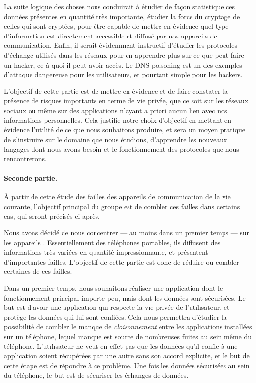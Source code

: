 \documentclass[a4paper, 12pt,twoside]{article}
\begin{document}
		La suite logique des choses nous conduirait à étudier de façon statistique ces données présentes en quantité très importante, étudier la force du cryptage de celles qui sont cryptées, pour être capable de mettre en évidence quel type d'information est directement accessible et diffusé par nos appareils de communication. Enfin,  il serait évidemment instructif d'étudier les protocoles d'échange utilisés dans les réseaux pour en apprendre plus sur ce que peut faire un hacker, ce à quoi il peut avoir accès. Le DNS poisoning est un des exemples d'attaque dangereuse pour les utilisateurs, et pourtant simple pour les hackers.
		
		L'objectif de cette partie est de mettre en évidence et de faire constater la présence de risques importants en terme de vie privée, que ce soit sur les réseaux sociaux ou même sur des applications n'ayant a priori aucun lien avec nos informations personnelles. Cela justifie notre choix d'objectif en mettant en évidence l'utilité de ce que nous souhaitons produire, et sera un moyen pratique de s'instruire sur le domaine que nous étudions, d'apprendre les nouveaux langages dont nous avons besoin et le fonctionnement des protocoles que nous rencontrerons.
		
		\paragraph{Seconde partie. } À partir de cette étude des failles des appareils de communication de la vie courante, l'objectif principal du groupe est de combler ces failles dans certains cas, qui seront précisés ci-après.
		
		Nous avons décidé de nous concentrer — au moins dans un premier temps — sur les appareils \Android{}. Essentiellement des téléphones portables, ils diffusent des informations très variées en quantité impressionnante, et présentent d'importantes failles. L'objectif de cette partie est donc de réduire ou combler certaines de ces failles.
		
		Dans un premier temps, nous souhaitons réaliser une application dont le fonctionnement principal importe peu, mais dont les données sont sécurisées. Le but est d'avoir une application qui respecte la vie privée de l'utilisateur, et protège les données qui lui sont confiées. Cela nous permettra d'étudier la possibilité de combler le manque de \emph{cloisonnement} entre les applications installées sur un téléphone, lequel manque est source de nombreuses fuites au sein même du téléphone. L'utilisateur ne veut en effet pas que les données qu'il confie à une application soient récupérées par une autre sans son accord explicite, et le but de cette étape est de répondre à ce problème. Une fois les données sécurisées au sein du téléphone, le but est de sécuriser les échanges de données.
		
\end{document}
